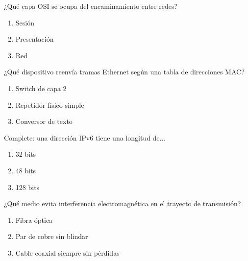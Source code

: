 \noindent\begin{minipage}{\linewidth}\setlength{\parskip}{4pt}\label{q:R-001}
¿Qué capa OSI se ocupa del encaminamiento entre redes?
\begin{enumerate}[label=\Alph*),nosep]
\item Sesión
\item Presentación
\item Red
\end{enumerate}\end{minipage}\par\medskip

\noindent\begin{minipage}{\linewidth}\setlength{\parskip}{4pt}\label{q:R-002}
¿Qué dispositivo reenvía tramas Ethernet según una tabla de direcciones MAC?
\begin{enumerate}[label=\Alph*),nosep]
\item Switch de capa 2
\item Repetidor físico simple
\item Conversor de texto
\end{enumerate}\end{minipage}\par\medskip

\noindent\begin{minipage}{\linewidth}\setlength{\parskip}{4pt}\label{q:R-003}
Complete: una dirección IPv6 tiene una longitud de...
\begin{enumerate}[label=\Alph*),nosep]
\item 32 bits
\item 48 bits
\item 128 bits
\end{enumerate}\end{minipage}\par\medskip

\noindent\begin{minipage}{\linewidth}\setlength{\parskip}{4pt}\label{q:R-004}
¿Qué medio evita interferencia electromagnética en el trayecto de transmisión?
\begin{enumerate}[label=\Alph*),nosep]
\item Fibra óptica
\item Par de cobre sin blindar
\item Cable coaxial siempre sin pérdidas
\end{enumerate}\end{minipage}\par\medskip

